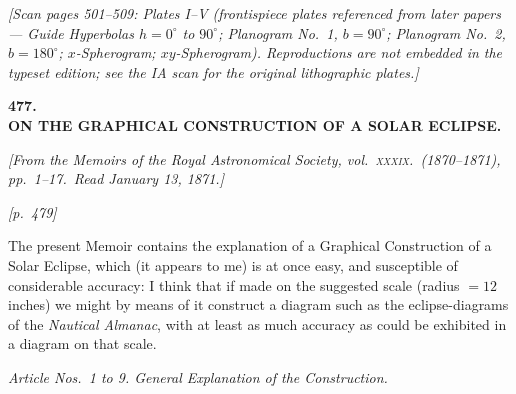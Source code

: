 \documentclass[11pt]{article}
\begin{document}

\begin{center}
\textit{[Scan pages 501--509: Plates I--V (frontispiece plates referenced from
later papers --- Guide Hyperbolas $h=0^{\circ}$ to $90^{\circ}$; Planogram
No.~1, $b=90^{\circ}$; Planogram No.~2, $b=180^{\circ}$; $x$-Spherogram;
$xy$-Spherogram). Reproductions are not embedded in the typeset edition; see
the IA scan for the original lithographic plates.]}
\end{center}

\vspace{1em}

\begin{center}
\textbf{\large 477.}\\[6pt]
\textbf{\Large ON THE GRAPHICAL CONSTRUCTION OF A SOLAR ECLIPSE.}
\end{center}

\medskip

\noindent\textit{[From the Memoirs of the Royal Astronomical Society, vol.~\textsc{xxxix}.\
(1870--1871), pp.~1--17.\ Read January 13, 1871.]}

\bigskip

\noindent\textit{[p.~479]}

\medskip

The present Memoir contains the explanation of a Graphical Construction of a
Solar Eclipse, which (it appears to me) is at once easy, and susceptible of
considerable accuracy: I think that if made on the suggested scale
(radius $=12$ inches) we might by means of it construct a diagram such as the
eclipse-diagrams of the \textit{Nautical Almanac}, with at least as much
accuracy as could be exhibited in a diagram on that scale.

\medskip

\begin{center}
\textit{Article Nos.\ 1 to 9. General Explanation of the Construction.}
\end{center}
\end{document}
